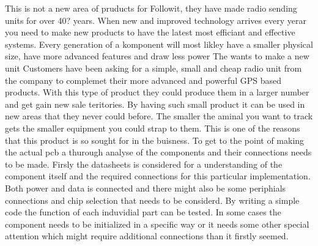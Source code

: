 
This is not a new area of pruducts for Followit, they have made radio sending units for over 40? years.
When new and improved technology arrives every yerar you need to make new products to have the latest most efficiant and effective systems. Every generation of a komponent will most likley have a smaller physical size, have more advanced features and draw less power The wants to make a new unit 
Customers have been asking for a simple, small and cheap radio unit from the company to complemet their more advanced and powerful GPS based products. With this type of product they could produce them in a larger number and get gain new sale teritories. By having such small product it can be used in new areas that they never could before. The smaller the aminal you want to track gets the smaller equipment you could strap to them. This is one of the reasons that this product is so sought for in the buisness. 
To get to the point of making the actual \gls{pcb} a thurough analyse of the components and their connections needs to be made. Firsly the datasheets is considered for a understanding of the component itself and the required connections for this particular implementation. Both power and data is connected and there might also be some periphials connections and chip selection that needs to be considerd. 
By writing a simple code the function of each induvidial part can be tested.  In some cases the component needs to be initialized in a specific way or it needs some other special attention which might require additional connections than it firstly seemed.

\thispagestyle{empty}